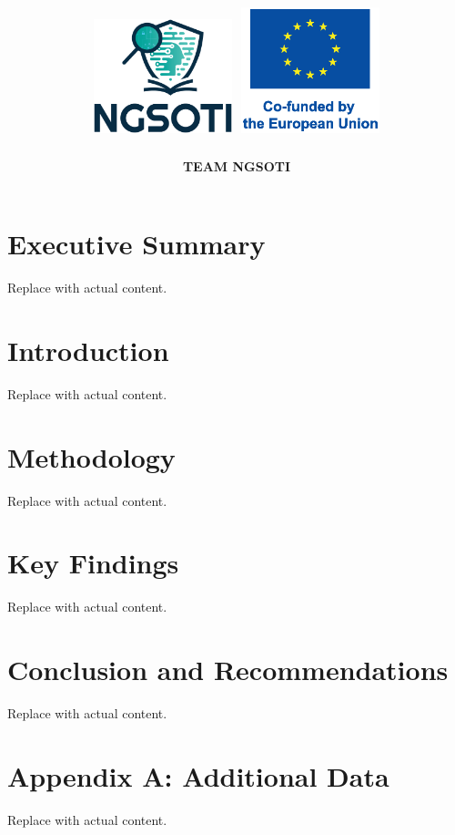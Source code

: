 \documentclass[10pt,a4paper]{report}
\title{
    \Huge \textbf{\reporttitle} \\[0.5cm]
    \Large \delivtitle \\[0.5cm]
    \includegraphics[width=0.3\textwidth]{img/ngsoti.eps}
    \hspace{1cm}
    \includegraphics[width=0.3\textwidth]{img/eu_funded_en.eps}
}
\author{\textbf{TEAM NGSOTI}}
\date{\reportdate}
\begin{document}
\maketitle
\thispagestyle{empty} %

\newpage
\tableofcontents
\newpage

\section*{Executive Summary}
Replace with actual content.

\section{Introduction}
Replace with actual content.

\section{Methodology}
Replace with actual content.

\section{Key Findings}
Replace with actual content.

\section{Conclusion and Recommendations}
Replace with actual content.

\appendix
\section{Appendix A: Additional Data}
Replace with actual content.

\newpage
\end{document}
